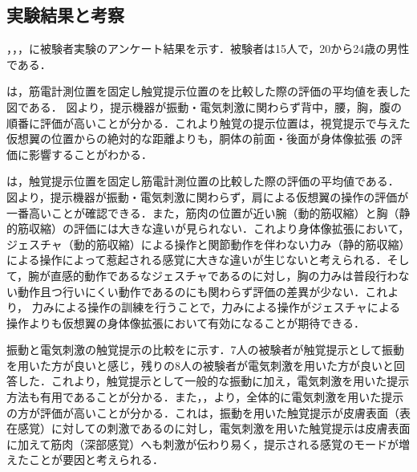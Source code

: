 \begin{small}
  \subsection{実験結果と考察}





        ，，，に被験者実験のアンケート結果を示す．被験者は15人で，20から24歳の男性である．

        は，筋電計測位置を固定し触覚提示位置のを比較した際の評価の平均値を表した図である．
        図より，提示機器が振動・電気刺激に関わらず背中，腰，胸，腹の順番に評価が高いことが分かる．これより触覚の提示位置は，視覚提示で与えた仮想翼の位置からの絶対的な距離よりも，胴体の前面・後面が身体像拡張
        の評価に影響することがわかる．

        は，触覚提示位置を固定し筋電計測位置の比較した際の評価の平均値である．
        図より，提示機器が振動・電気刺激に関わらず，肩による仮想翼の操作の評価が一番高いことが確認できる．また，筋肉の位置が近い腕（動的筋収縮）と胸（静的筋収縮）の評価には大きな違いが見られない．これより身体像拡張において，ジェスチャ（動的筋収縮）による操作と関節動作を伴わない力み（静的筋収縮）による操作によって惹起される感覚に大きな違いが生じないと考えられる．そして，腕が直感的動作であるなジェスチャであるのに対し，胸の力みは普段行わない動作且つ行いにくい動作であるのにも関わらず評価の差異が少ない．これより，
        力みによる操作の訓練を行うことで，力みによる操作がジェスチャによる操作よりも仮想翼の身体像拡張において有効になることが期待できる．

        振動と電気刺激の触覚提示の比較をに示す．7人の被験者が触覚提示として振動を用いた方が良いと感じ，残りの8人の被験者が電気刺激を用いた方が良いと回答した．これより，触覚提示として一般的な振動に加え，電気刺激を用いた提示方法も有用であることが分かる．また，，より，全体的に電気刺激を用いた提示の方が評価が高いことが分かる．これは，振動を用いた触覚提示が皮膚表面（表在感覚）に対しての刺激であるのに対し，電気刺激を用いた触覚提示は皮膚表面に加えて筋肉（深部感覚）へも刺激が伝わり易く，提示される感覚のモードが増えたことが要因と考えられる．


\end{small}
